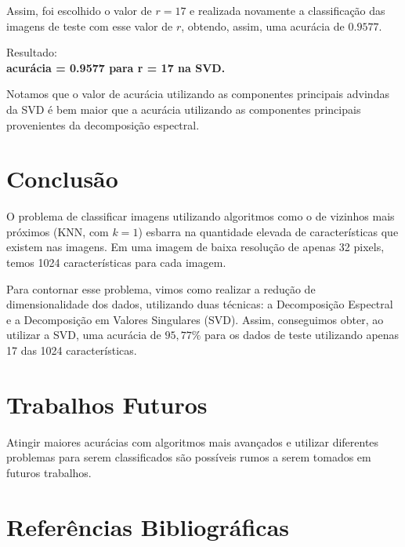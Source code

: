 \documentclass[a4paper, 12pt]{article}
\theoremstyle{definition}
\theoremstyle{remark}
\begin{document}
Assim, foi escolhido o valor de $r = 17$ e realizada novamente a classificação das imagens de teste com esse valor de $r$, obtendo, assim, uma acurácia de $0.9577$.

Resultado:\\
\textbf{
acurácia = 0.9577 para r = 17 na SVD.}

Notamos que o valor de acurácia utilizando as componentes principais advindas da SVD é bem maior que a acurácia utilizando as componentes principais provenientes da decomposição espectral.

\newpage

\section{Conclusão}

O problema de classificar imagens utilizando algoritmos como o de vizinhos mais próximos (KNN, com $k = 1$) esbarra na quantidade elevada de características que existem nas imagens. Em uma imagem de baixa resolução de apenas 32 pixels, temos 1024 características para cada imagem.

Para contornar esse problema, vimos como realizar a redução de dimensionalidade dos dados, utilizando duas técnicas: a Decomposição Espectral e a Decomposição em Valores Singulares (SVD). Assim, conseguimos obter, ao utilizar a SVD, uma acurácia de $95,77\%$ para os dados de teste utilizando apenas 17 das 1024 características.

\newpage
\section{Trabalhos Futuros}

Atingir maiores acurácias com algoritmos mais avançados e utilizar diferentes problemas para serem classificados são possíveis rumos a serem tomados em futuros trabalhos.

\newpage
\section{Referências Bibliográficas}

\nocite{algebra-linear-teoria-e-aplicacoes}

\printbibliography[heading=none]
\end{document}

